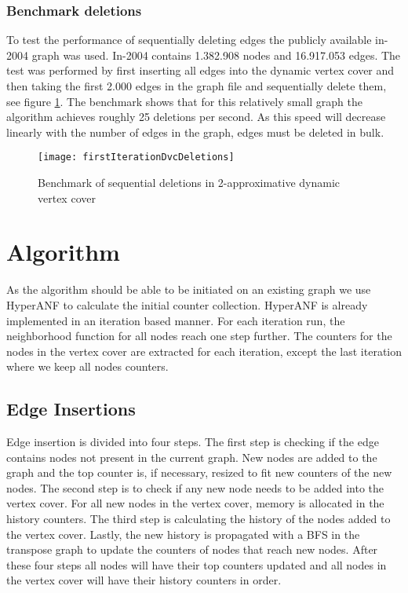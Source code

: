 \subsubsection{Benchmark deletions}
To test the performance of sequentially deleting edges the publicly available in-2004 graph was used. In-2004 contains 1.382.908 nodes and 16.917.053 edges. The test was performed by first inserting all edges into the dynamic vertex cover and then taking the first 2.000 edges in the graph file and sequentially delete them, see figure \ref{fig:firstIterationDvcDeletion}. The benchmark shows that for this relatively small graph the algorithm achieves roughly 25 deletions per second. As this speed will decrease linearly with the number of edges in the graph, edges must be deleted in bulk.


\begin{figure}[h]
\centering
\texttt{[image: firstIterationDvcDeletions]}    
\captionsetup{justification=centering}
\caption {Benchmark of sequential deletions in 2-approximative dynamic vertex cover}
\label{fig:firstIterationDvcDeletion}
\end{figure}


\section{Algorithm}


As the algorithm should be able to be initiated on an existing graph we use HyperANF to calculate the initial counter collection. HyperANF is already implemented in an iteration based manner. For each iteration run, the neighborhood function for all nodes reach one step further. The counters for the nodes in the vertex cover are extracted for each iteration, except the last iteration where we keep all nodes counters. 

\subsection{Edge Insertions}

Edge insertion is divided into four steps. The first step is checking if the edge contains nodes not present in the current graph. New nodes are added to the graph and the top counter is, if necessary, resized to fit new counters of the new nodes. The second step is to check if any new node needs to be added into the vertex cover. For all new nodes in the vertex cover, memory is allocated in the history counters. The third step is calculating the history of the nodes added to the vertex cover. Lastly, the new history is propagated with a BFS in the transpose graph to update the counters of nodes that reach new nodes. After these four steps all nodes will have their top counters updated and all nodes in the vertex cover will have their history counters in order. 

